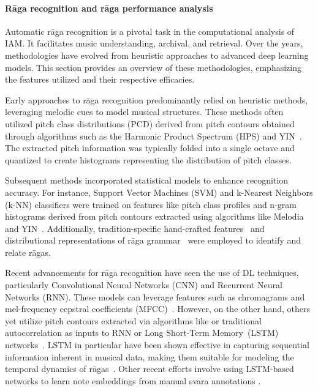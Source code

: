 \paragraph*{Rāga recognition and rāga performance analysis}
Automatic rāga recognition is a pivotal task in the computational analysis of \acrshort{IAM}. It facilitates music understanding, archival, and retrieval. Over the years, methodologies have evolved from heuristic approaches to advanced deep learning models. This section provides an overview of these methodologies, emphasizing the features utilized and their respective efficacies. 


Early approaches to rāga recognition predominantly relied on heuristic methods, leveraging melodic cues to model musical structures. These methods often utilized pitch class distributions (PCD) derived from pitch contours obtained through algorithms such as the Harmonic Product Spectrum (HPS) and YIN~\citep{chordia-raga,belle-raga,rao-pitch}. The extracted pitch information was typically folded into a single octave and quantized to create histograms representing the distribution of pitch classes. %

Subsequent methods incorporated statistical models to enhance recognition accuracy. For instance, Support Vector Machines (SVM) and k-Nearest Neighbors (k-NN) classifiers were trained on features like pitch class profiles and n-gram histograms derived from pitch contours extracted using algorithms like Melodia and YIN~\citep{decheveigne-yin,koduri-raga,salamon-melodia,kumar-raga}. Additionally, tradition-specific hand-crafted features~\citep{bhattacharjee-raga_transition,gulati-motifs_communities} and distributional representations of rāga grammar~\citep{ganguli-distributional} were employed to identify and relate rāgas.

Recent advancements for rāga recognition have seen the use of \acrshort{DL} techniques, particularly Convolutional Neural Networks (CNN) and Recurrent Neural Networks (RNN). These models can leverage features such as chromagrams and mel-frequency cepstral coefficients (MFCC)~\citep{chowdhuri-raga,shah-raga_recognition}. However, on the other hand, others yet utilize pitch contours extracted via algorithms like \citep{salamon-melodia} or traditional autocorrelation as inputs to RNN or Long Short-Term Memory~(LSTM) networks~\citep{anand-raga,madhusudhan-deepsrgm}. LSTM in particular have been shown effective in capturing sequential information inherent in musical data, making them suitable for modeling the temporal dynamics of rāgas~\citep{madhusudhan-deepsrgm,vishnu-lstm_raga}. Other recent efforts involve using LSTM-based networks to learn note embeddings from manual svara annotations \citep{ross-raga_similarity}. 


